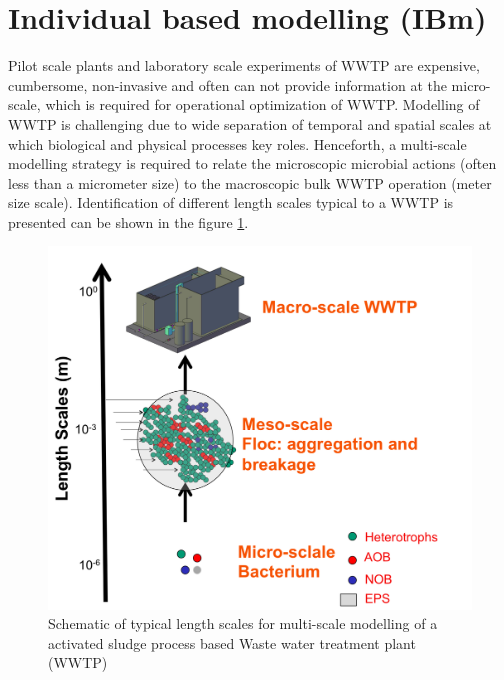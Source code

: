 \documentclass[11pt,a4paper,openright]{article}
\begin{document}
\section{Individual based modelling (IBm)}
Pilot scale plants and laboratory scale experiments of WWTP are expensive, cumbersome, non-invasive and often can not provide information at the micro-scale, which is required for operational optimization of WWTP. Modelling of WWTP is challenging due to wide separation of temporal and spatial scales at which biological and physical processes key roles. Henceforth, a multi-scale modelling strategy is required to relate the microscopic microbial actions (often less than a micrometer size) to the macroscopic bulk WWTP operation (meter size scale). Identification of different length scales typical to a WWTP is presented can be shown in the figure \ref{fig:lscale}.  

\begin{figure}[!htb]
\begin{center}
  \includegraphics[width=0.5\columnwidth]{Figs/lengthscales.png}
\caption{Schematic of typical length scales for multi-scale modelling of a activated sludge process based Waste water treatment plant (WWTP)}
\label{fig:lscale}       %
\end{center}
\end{figure}  
 
\end{document}
